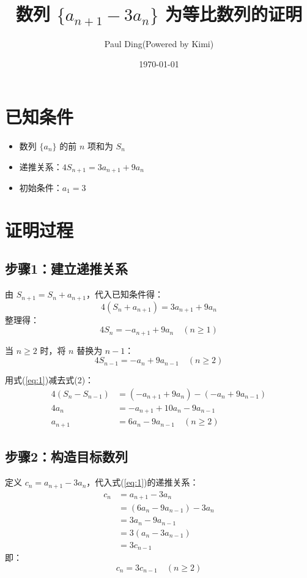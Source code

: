 \documentclass{ctexart}
\title{数列 $\{a_{n+1} - 3a_n\}$ 为等比数列的证明}
\author{Paul Ding(Powered by Kimi)}
\date{\today}
\begin{document}
\maketitle

\section{已知条件}
\begin{itemize}
    \item 数列 $\{a_n\}$ 的前 $n$ 项和为 $S_n$
    \item 递推关系：$4S_{n+1} = 3a_{n+1} + 9a_n$
    \item 初始条件：$a_1 = 3$
\end{itemize}

\section{证明过程}

\subsection{步骤1：建立递推关系}
由 $S_{n+1} = S_n + a_{n+1}$，代入已知条件得：
\begin{equation}
    4(S_n + a_{n+1}) = 3a_{n+1} + 9a_n
\end{equation}
整理得：
\begin{equation}\label{eq:1}
    4S_n = -a_{n+1} + 9a_n \quad (n \geq 1)
\end{equation}

当 $n \geq 2$ 时，将 $n$ 替换为 $n-1$：
\begin{equation}
    4S_{n-1} = -a_n + 9a_{n-1} \quad (n \geq 2)
\end{equation}

用式(\ref{eq:1})减去式(2)：
\begin{align*}
    4(S_n - S_{n-1}) &= (-a_{n+1} + 9a_n) - (-a_n + 9a_{n-1}) \\
    4a_n &= -a_{n+1} + 10a_n - 9a_{n-1} \\
    a_{n+1} &= 6a_n - 9a_{n-1} \quad (n \geq 2)
\end{align*}

\subsection{步骤2：构造目标数列}
定义 $c_n = a_{n+1} - 3a_n$，代入式(\ref{eq:1})的递推关系：
\begin{align*}
    c_n &= a_{n+1} - 3a_n \\
        &= (6a_n - 9a_{n-1}) - 3a_n \\
        &= 3a_n - 9a_{n-1} \\
        &= 3(a_n - 3a_{n-1}) \\
        &= 3c_{n-1}
\end{align*}
即：
\begin{equation}
    c_n = 3c_{n-1} \quad (n \geq 2)
\end{equation}
\end{document}
